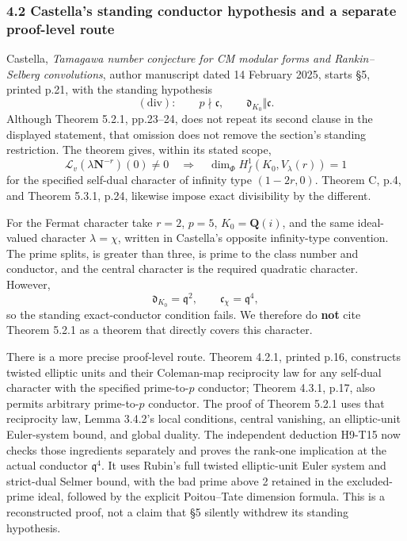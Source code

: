 \subsubsection{4.2 Castella's standing conductor hypothesis and a
separate proof-level
route}\label{castellas-standing-conductor-hypothesis-and-a-separate-proof-level-route}

Castella, \emph{Tamagawa number conjecture for CM modular forms and
Rankin--Selberg convolutions}, author manuscript dated 14 February 2025,
starts §5, printed p.21, with the standing hypothesis \[
(\mathrm{div}):\qquad p\nmid\mathfrak c,\qquad
\mathfrak d_{K_0}\Vert\mathfrak c.
\] Although Theorem 5.2.1, pp.23--24, does not repeat its second clause
in the displayed statement, that omission does not remove the section's
standing restriction. The theorem gives, within its stated scope, \[
\mathcal L_v(\lambda\mathbf N^{-r})(0)\ne0
\quad\Longrightarrow\quad
\dim_\Phi H^1_f(K_0,V_\lambda(r))=1
\tag{AR17.2}
\] for the specified self-dual character of infinity type \((1-2r,0)\).
Theorem C, p.4, and Theorem 5.3.1, p.24, likewise impose exact
divisibility by the different.

For the Fermat character take \(r=2\), \(p=5\), \(K_0=\mathbf Q(i)\),
and the same ideal-valued character \(\lambda=\chi\), written in
Castella's opposite infinity-type convention. The prime splits, is
greater than three, is prime to the class number and conductor, and the
central character is the required quadratic character. However, \[
\mathfrak d_{K_0}=\mathfrak q^2,\qquad
\mathfrak c_\chi=\mathfrak q^4,
\] so the standing exact-conductor condition fails. We therefore do
\textbf{not} cite Theorem 5.2.1 as a theorem that directly covers this
character.

There is a more precise proof-level route. Theorem 4.2.1, printed p.16,
constructs twisted elliptic units and their Coleman-map reciprocity law
for any self-dual character with the specified prime-to-\(p\) conductor;
Theorem 4.3.1, p.17, also permits arbitrary prime-to-\(p\) conductor.
The proof of Theorem 5.2.1 uses that reciprocity law, Lemma 3.4.2's
local conditions, central vanishing, an elliptic-unit Euler-system
bound, and global duality. The independent deduction H9-T15 now checks
those ingredients separately and proves the rank-one implication at the
actual conductor \(\mathfrak q^4\). It uses Rubin's full twisted
elliptic-unit Euler system and strict-dual Selmer bound, with the bad
prime above 2 retained in the excluded-prime ideal, followed by the
explicit Poitou--Tate dimension formula. This is a reconstructed proof,
not a claim that §5 silently withdrew its standing hypothesis.

